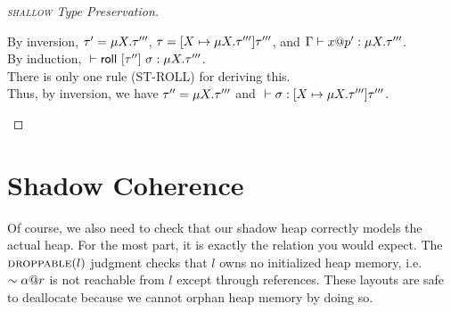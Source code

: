 \begin{proof}[\textsc{shallow} Type Preservation]
\begin{itemize}
      By inversion, $\tau' = \mu {X}.{\tau'''}$, $\tau = [{X} \mapsto {\mu {X}.{\tau'''}}] {\tau'''}$,
      and ${\Gamma} \vdash {{x}@{p'}} : {\mu {X}.{\tau'''}}$. \\
      By induction, ${} \vdash {\mathsf{roll}~[{\tau''}]~{\sigma}} : {\mu {X}.{\tau'''}}$. \\
      There is only one rule (\textsc{ST-ROLL}) for deriving this. \\
      Thus, by inversion, we have $\tau'' = \mu {X}.{\tau'''}$ and 
      ${} \vdash {\sigma} : {[{X} \mapsto {\mu {X}.{\tau'''}}] {\tau'''}}$.
  \end{itemize}
\end{proof}

\section*{Shadow Coherence}
Of course, we also need to check that our shadow heap correctly models
the actual heap. For the most part, it is exactly the relation you would expect.
The $\textsc{droppable}(l)$ judgment checks that $l$ owns no initialized heap memory,
i.e. $\sim{{\alpha}@{r}}$ is not reachable from $l$ except through references.
These layouts are safe to deallocate because we cannot orphan heap memory by doing so.
\newline




